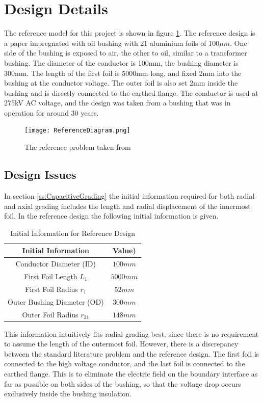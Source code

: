 \section{Design Details}
The reference model for this project is shown in figure \ref{figure:refproblem}. 
The reference design is a paper impregnated with oil bushing with 21 aluminium foils of $100\mu m$.
One side of the bushing is exposed to air, the other to oil, similar to a transformer bushing.
The diameter of the conductor is 100mm, the bushing diameter is 300mm.
The length of the first foil is 5000mm long, and fixed 2mm into the bushing at the conductor voltage.
The outer foil is also set 2mm inside the bushing and is directly connected to the earthed flange.
The conductor is used at 275kV AC voltage, and the design was taken from a bushing that was in operation for around 30 years.
\begin{figure}[!h]
   \centering
   \texttt{[image: ReferenceDiagram.png]}
   \caption{The reference problem taken from \cite{Chen14}}
   \label{figure:refproblem}
\end{figure}

\subsection{Design Issues}
In section \ref{ss:CapacitiveGrading} the initial information required for both radial and axial grading includes the length and radial displacement of the innermost foil.
In the reference design the following initial information is given.

\begin{table}[!htb]
\caption{Initial Information for Reference Design}
\label{table:initinfo}
\begin{center}
\begin{tabular}{cc}
\toprule
\textbf{Initial Information} & \textbf{Value)} \\ \toprule
Conductor Diameter (ID) & $100mm$ \\
First Foil Length $L_1$ & $5000mm$ \\
First Foil Radius $r_1$&$52mm$ \\
Outer Bushing Diameter (OD) & $300mm$\\
Outer Foil Radius $r_21$ & $148mm$\\
\bottomrule
\end{tabular}
\end{center}
\end{table} 

This information intuitively fits radial grading best, since there is no requirement to assume the length of the outermost foil.
However, there is a discrepancy between the standard literature problem and the reference design.
The first foil is connected to the high voltage conductor, and the last foil is connected to the earthed flange.
This is to eliminate the electric field on the boundary interface as far as possible on both sides of the bushing, so that the voltage drop occurs exclusively inside the bushing insulation.

